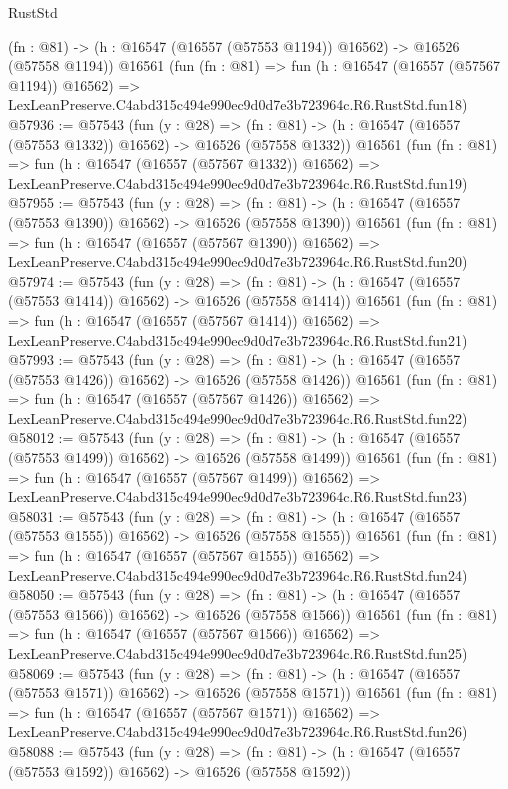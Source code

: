 \begin{lexlean}{RustStd}
\begin{coremodule}
    (fn : @81) -> (h : @16547 (@16557 (@57553 @1194)) @16562) -> @16526 (@57558 @1194))
    @16561
    (fun (fn : @81) =>
    fun (h : @16547 (@16557 (@57567 @1194)) @16562) =>
    LexLeanPreserve.C4abd315c494e990ec9d0d7e3b723964c.R6.RustStd.fun18)
@57936 := @57543
    (fun (y : @28) =>
    (fn : @81) -> (h : @16547 (@16557 (@57553 @1332)) @16562) -> @16526 (@57558 @1332))
    @16561
    (fun (fn : @81) =>
    fun (h : @16547 (@16557 (@57567 @1332)) @16562) =>
    LexLeanPreserve.C4abd315c494e990ec9d0d7e3b723964c.R6.RustStd.fun19)
@57955 := @57543
    (fun (y : @28) =>
    (fn : @81) -> (h : @16547 (@16557 (@57553 @1390)) @16562) -> @16526 (@57558 @1390))
    @16561
    (fun (fn : @81) =>
    fun (h : @16547 (@16557 (@57567 @1390)) @16562) =>
    LexLeanPreserve.C4abd315c494e990ec9d0d7e3b723964c.R6.RustStd.fun20)
@57974 := @57543
    (fun (y : @28) =>
    (fn : @81) -> (h : @16547 (@16557 (@57553 @1414)) @16562) -> @16526 (@57558 @1414))
    @16561
    (fun (fn : @81) =>
    fun (h : @16547 (@16557 (@57567 @1414)) @16562) =>
    LexLeanPreserve.C4abd315c494e990ec9d0d7e3b723964c.R6.RustStd.fun21)
@57993 := @57543
    (fun (y : @28) =>
    (fn : @81) -> (h : @16547 (@16557 (@57553 @1426)) @16562) -> @16526 (@57558 @1426))
    @16561
    (fun (fn : @81) =>
    fun (h : @16547 (@16557 (@57567 @1426)) @16562) =>
    LexLeanPreserve.C4abd315c494e990ec9d0d7e3b723964c.R6.RustStd.fun22)
@58012 := @57543
    (fun (y : @28) =>
    (fn : @81) -> (h : @16547 (@16557 (@57553 @1499)) @16562) -> @16526 (@57558 @1499))
    @16561
    (fun (fn : @81) =>
    fun (h : @16547 (@16557 (@57567 @1499)) @16562) =>
    LexLeanPreserve.C4abd315c494e990ec9d0d7e3b723964c.R6.RustStd.fun23)
@58031 := @57543
    (fun (y : @28) =>
    (fn : @81) -> (h : @16547 (@16557 (@57553 @1555)) @16562) -> @16526 (@57558 @1555))
    @16561
    (fun (fn : @81) =>
    fun (h : @16547 (@16557 (@57567 @1555)) @16562) =>
    LexLeanPreserve.C4abd315c494e990ec9d0d7e3b723964c.R6.RustStd.fun24)
@58050 := @57543
    (fun (y : @28) =>
    (fn : @81) -> (h : @16547 (@16557 (@57553 @1566)) @16562) -> @16526 (@57558 @1566))
    @16561
    (fun (fn : @81) =>
    fun (h : @16547 (@16557 (@57567 @1566)) @16562) =>
    LexLeanPreserve.C4abd315c494e990ec9d0d7e3b723964c.R6.RustStd.fun25)
@58069 := @57543
    (fun (y : @28) =>
    (fn : @81) -> (h : @16547 (@16557 (@57553 @1571)) @16562) -> @16526 (@57558 @1571))
    @16561
    (fun (fn : @81) =>
    fun (h : @16547 (@16557 (@57567 @1571)) @16562) =>
    LexLeanPreserve.C4abd315c494e990ec9d0d7e3b723964c.R6.RustStd.fun26)
@58088 := @57543
    (fun (y : @28) =>
    (fn : @81) -> (h : @16547 (@16557 (@57553 @1592)) @16562) -> @16526 (@57558 @1592))

\end{coremodule}
\end{lexlean}
